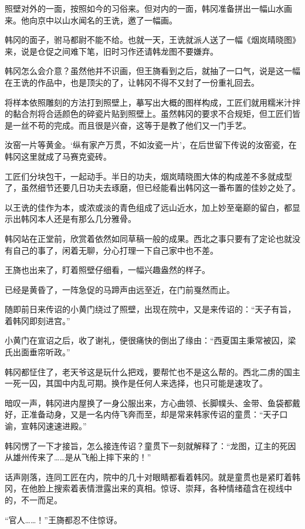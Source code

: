 照壁对外的一面，按照如今的习俗来。但对内的一面，韩冈准备拼出一幅山水画来。他向京中以山水闻名的王诜，邀了一幅画。

韩冈的面子，驸马都尉不能不给。也就一天，王诜就派人送了一幅《烟岚晴晓图》来，说是仓促之间难下笔，旧时习作还请韩龙图不要嫌弃。

韩冈怎么会介意？虽然他并不识画，但王旖看到之后，就抽了一口气，说是这一幅在王诜的作品中，也是顶尖的了，让韩冈不得不又封了一份重礼回去。

将样本依照雕刻的方法打到照壁上，摹写出大概的图样构成，工匠们就用糯米汁拌的黏合剂将合适颜色的碎瓷片贴到照壁上。虽然韩冈的要求不合规矩，但工匠们皆是一丝不苟的完成。而且很是兴奋，这等于是教了他们又一门手艺。

汝窑一片等黄金。‘纵有家产万贯，不如汝瓷一片’，在后世留下传说的汝窑瓷，在韩冈这里就成了马赛克瓷砖。

工匠们分块包干，一起动手。半日的功夫，烟岚晴晓图大体的构成差不多就成型了，虽然细节还要几日功夫去琢磨，但已经能看出韩冈这一番布置的佳妙之处了。

以王诜的佳作为本，或浓或淡的青色组成了远山近水，加上妙至毫巅的留白，都显示出韩冈本人还是有那么几分雅骨。

韩冈站在正堂前，欣赏着依然如同草稿一般的成果。西北之事只要有了定论也就没有自己的事了，闲着无聊，分心打理一下自己家中也不差。

王旖也出来了，盯着照壁仔细看，一幅兴趣盎然的样子。

已经是黄昏了，一阵急促的马蹄声由远至近，在门前戛然而止。

随即前日来传诏的小黄门绕过了照壁，出现在院中，又是来传诏的：“天子有旨，着韩冈即刻进宫。”

小黄门在宣诏之后，收了谢礼，便很痛快的倒出了缘由：“西夏国主秉常被囚，梁氏出面垂帘听政。”

韩冈都怔住了，老天爷这是玩什么把戏，要帮忙也不是这么帮的。西北二虏的国主一死一囚，其国中内乱可期。换作是任何人来选择，也只可能是速攻了。

暗叹一声，韩冈进内屋换了一身公服出来，方心曲领、长脚幞头、金带、鱼袋都戴好，正准备动身，又是一名内侍飞奔而至，却是常来韩家传诏的童贯：“天子口谕，宣韩冈速速进殿。”

韩冈愣了一下才接旨，怎么接连传诏？童贯下一刻就解释了：“龙图，辽主的死因从雄州传来了……是从飞船上摔下来的！”

话声刚落，连同工匠在内，院中的几十对眼睛都看着韩冈。就是童贯也是紧盯着韩冈，在他脸上搜索着表情泄露出来的真相。惊讶、崇拜，各种情绪蕴含在视线中的，不一而足。

“官人……！”王旖都忍不住惊讶。

